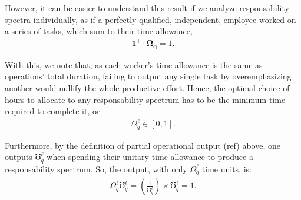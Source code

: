 \documentclass[hidelinks, nonatbib]{elsarticle}
\begin{document}
\begin{enumerate}
    However, it can be easier to understand this result if we analyze responsability spectra individually, as if a perfectly qualified, independent, employee worked on a series of tasks, which sum to their time allowance,
    \begin{gather}
        \boldsymbol{1} ^ {\top}
        \cdot
        \boldsymbol{\Omega_{q}}
        = 
        1
        .
    \end{gather}
    
    With this, we note that, as each worker's time allowance is the same as operations' total duration, failing to output any single task by overemphasizing another would nullify the whole productive effort. Hence, the optimal choice of hours to allocate to any responsability spectrum has to be the minimum time required to complete it, or
    \begin{gather}
        \Omega_{q}^{\ell} 
        \in
        [0,1]
        .
    \end{gather}

    Furthermore, by the definition of partial operational output (ref) above, one outputs $\mho_{q}^{\ell}$ when spending their unitary time allowance to produce a responsability spectrum. So, the output, with only $\Omega_{q}^{\ell}$ time units, is:
    \begin{gather}
        \Omega_{q}^{\ell}
        \mho_{q}^{\ell}
        =
        \left(
            \frac{1}{\mho_{q}^{\ell}}
        \right)
        \times
        \mho_{q}^{\ell}
        =
        1
        .
    \end{gather}
    

\end{enumerate}
\end{document}
